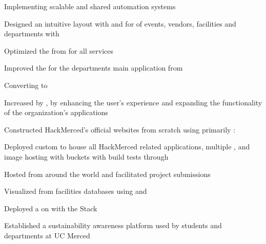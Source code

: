 \documentclass[]{hackathons}
\begin{document}
\begin{minipage}[t]{0.64\textwidth}
\begin{tightemize}
\item Implementing scalable and shared  automation systems
\item Designed an intuitive layout with  and  for  of events, vendors, facilities and departments with 
\item Optimized the  from  for all services
\item Improved the  for the departments main application from 
\item Converting  to 
\item Increased  by , by enhancing the user's experience and expanding the functionality of the organization's applications
\end{tightemize}
\medskip

\begin{tightemize}
\item Constructed HackMerced's official websites from scratch using primarily : 
\item Deployed custom  to house all HackMerced related applications, multiple , and image hosting with  buckets with build tests through 
\item Hosted  from around the world and facilitated  project submissions
\end{tightemize}
\medskip

\begin{tightemize}
\item Visualized  from facilities databases using  and 
\item Deployed a  on  with the  Stack
\item Established a sustainability awareness platform used by  students and  departments at UC Merced
\end{tightemize}
\medskip


\end{minipage}
\end{document}
